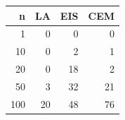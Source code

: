 
\begin{tabular}{rrrr}
\toprule
n & LA & EIS & CEM\\
\midrule
1 & 0 & 0 & 0\\
10 & 0 & 2 & 1\\
20 & 0 & 18 & 2\\
50 & 3 & 32 & 21\\
100 & 20 & 48 & 76\\
\bottomrule
\end{tabular}